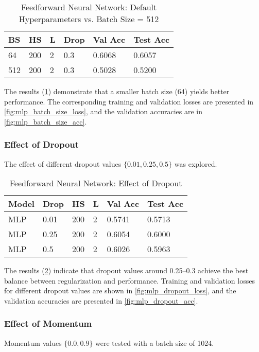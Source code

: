 \begin{table}[h]
\centering
\caption{Feedforward Neural Network: Default Hyperparameters vs. Batch Size = 512}
\label{tab:mlp_batch_sizes}
\begin{tabularx}{\columnwidth}{|X|X|X|X|X|X|}
\hline
 \textbf{BS} & \textbf{HS} & \textbf{L} & \textbf{Drop} & \textbf{Val Acc} & \textbf{Test Acc} \\ \hline
 64 & 200 & 2 & 0.3 & 0.6068 & 0.6057 \\ \hline
 512 & 200 & 2 & 0.3 & 0.5028 & 0.5200 \\ \hline
\end{tabularx}
\end{table}

The results (\cref{tab:mlp_batch_sizes}) demonstrate that a smaller batch size (64) yields better performance. The corresponding training and validation losses are presented in \cref{fig:mlp_batch_size_loss}, and the validation accuracies are in \cref{fig:mlp_batch_size_acc}.

\subsubsection{Effect of Dropout}
The effect of different dropout values $\{0.01, 0.25, 0.5\}$ was explored.

\begin{table}[h]
\centering
\caption{Feedforward Neural Network: Effect of Dropout}
\label{tab:mlp_dropout}
\begin{tabularx}{\columnwidth}{|X|X|X|X|X|X|}
\hline
\textbf{Model} & \textbf{Drop} & \textbf{HS} & \textbf{L} & \textbf{Val Acc} & \textbf{Test Acc} \\ \hline
MLP & 0.01 & 200 & 2 & 0.5741 & 0.5713 \\ \hline
MLP & 0.25 & 200 & 2 & 0.6054 & 0.6000 \\ \hline
MLP & 0.5 & 200 & 2 & 0.6026 & 0.5963 \\ \hline
\end{tabularx}
\end{table}

The results (\cref{tab:mlp_dropout}) indicate that dropout values around 0.25–0.3 achieve the best balance between regularization and performance. Training and validation losses for different dropout values are shown in \cref{fig:mlp_dropout_loss}, and the validation accuracies are presented in \cref{fig:mlp_dropout_acc}.

\subsubsection{Effect of Momentum}
Momentum values $\{0.0, 0.9\}$ were tested with a batch size of 1024.

